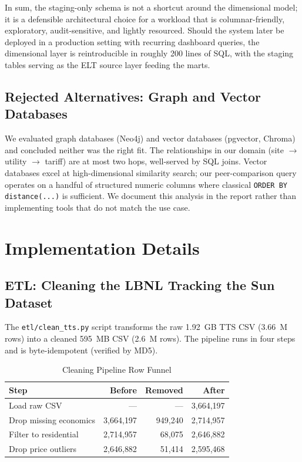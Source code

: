 \documentclass[10pt, conference]{IEEEtran}
\begin{document}
In sum, the staging-only schema is not a shortcut around the dimensional
model; it is a defensible architectural choice for a workload that is
columnar-friendly, exploratory, audit-sensitive, and lightly resourced.
Should the system later be deployed in a production setting with
recurring dashboard queries, the dimensional layer is reintroducible
in roughly 200 lines of SQL, with the staging tables serving as the
ELT source layer feeding the marts.

\subsection{Rejected Alternatives: Graph and Vector Databases}

We evaluated graph databases (Neo4j) and vector databases (pgvector, Chroma) and concluded neither was the right fit. The relationships in our domain (site $\rightarrow$ utility $\rightarrow$ tariff) are at most two hops, well-served by SQL joins. Vector databases excel at high-dimensional similarity search; our peer-comparison query operates on a handful of structured numeric columns where classical \texttt{ORDER BY distance(...)} is sufficient. We document this analysis in the report rather than implementing tools that do not match the use case.

\section{Implementation Details}

\subsection{ETL: Cleaning the LBNL Tracking the Sun Dataset}

The \texttt{etl/clean\_tts.py} script transforms the raw 1.92~GB TTS CSV (3.66~M rows) into a cleaned 595~MB CSV (2.6~M rows). The pipeline runs in four steps and is byte-idempotent (verified by MD5).

\begin{table}[H]
\centering
\caption{Cleaning Pipeline Row Funnel}
\label{tab:cleaning}
\small
\begin{tabular}{lrrr}
\toprule
\textbf{Step} & \textbf{Before} & \textbf{Removed} & \textbf{After} \\
\midrule
Load raw CSV & --- & --- & 3{,}664{,}197 \\
Drop missing economics & 3{,}664{,}197 & 949{,}240 & 2{,}714{,}957 \\
Filter to residential & 2{,}714{,}957 & 68{,}075 & 2{,}646{,}882 \\
Drop price outliers & 2{,}646{,}882 & 51{,}414 & 2{,}595{,}468 \\
\bottomrule
\end{tabular}
\end{table}
\end{document}
